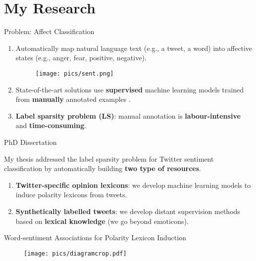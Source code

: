 \documentclass[handout]{beamer}
\begin{document}
\section{My Research}






\begin{frame}{Problem: Affect Classification}
\begin{scriptsize}
  \begin{enumerate}
   \item Automatically map natural language text (e.g., a tweet, a word) into affective states (e.g., anger, fear, positive, negative).
   
     \begin{figure}[h]
        	\texttt{[image: pics/sent.png]}
        \end{figure}
   \item State-of-the-art solutions use \textbf{supervised} machine learning models trained from \textbf{manually} annotated examples \cite{NRCJAIR14}.
   \item \textbf{Label sparsity problem (LS)}: manual annotation is \textbf{labour-intensive} and \textbf{time-consuming}. 
  \end{enumerate} 
\end{scriptsize}

\end{frame}



\begin{frame}{PhD Dissertation}

My thesis addressed the label sparsity problem for Twitter sentiment classification by automatically building \textbf{two type of resources}. 
\begin{enumerate}
 \item \textbf{Twitter-specific opinion lexicons}: we develop machine learning models to induce polarity lexicons from tweets. 
 \item  \textbf{Synthetically labelled tweets}: we develop distant supervision methods based on \textbf{lexical knowledge} (we go beyond emoticons). 
 \end{enumerate}

\end{frame}




\begin{frame}{Word-sentiment Associations for Polarity Lexicon Induction}
\begin{figure}[htb]
	\centering
	 \texttt{[image: pics/diagramcrop.pdf]}
	\label{fig:sosgd}
\end{figure}
\end{frame}
\end{document}
